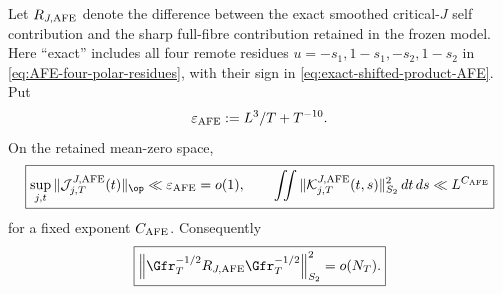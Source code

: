 \begin{lemma}
\label{lem:J-AFE-relative-regular}
Let $R_{J,\rm AFE}$ denote the difference between the exact smoothed
critical-$J$ self contribution and the sharp full-fibre contribution retained
in the frozen model.  Here ``exact'' includes all four remote residues
$u=-s_1,1-s_1,-s_2,1-s_2$ in
\eqref{eq:AFE-four-polar-residues}, with their sign in
\eqref{eq:exact-shifted-product-AFE}.  Put
\[
\varepsilon_{\rm AFE}:=L^3/T+T^{-10}.
\]
On the retained mean-zero space,
\begin{equation}
\boxed{
\sup_{j,t}\|\mathcal J^{J,\rm AFE}_{j,T}(t)\|_{\op}
\ll\varepsilon_{\rm AFE}=o(1),
\qquad
\iint\|\mathcal K^{J,\rm AFE}_{j,T}(t,s)\|_{S_2}^2\,dt\,ds
\ll L^{C_{\rm AFE}}
}
\label{eq:J-AFE-shell-regular}
\end{equation}
for a fixed exponent $C_{\rm AFE}$.  Consequently
\begin{equation}
\boxed{
\left\|\Gfr_T^{-1/2}R_{J,\rm AFE}\Gfr_T^{-1/2}\right\|_{S_2}^2
=o(N_T).
}
\label{eq:J-AFE-relative-HS}
\end{equation}
\end{lemma}

